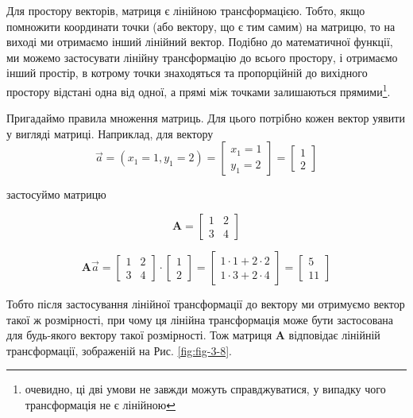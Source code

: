 \documentclass[
  11pt,
]{book}
\begin{document}
Для простору векторів, матриця є лінійною трансформацією. Тобто, якщо помножити координати точки (або вектору, що є тим самим) на матрицю, то на виході ми отримаємо інший лінійний вектор. Подібно до математичної функції, ми можемо застосувати лінійну трансформацію до всього простору, і отримаємо інший простір, в котрому точки знаходяться та пропорційній до вихідного простору відстані одна від одної, а прямі між точками залишаються прямими\footnote{очевидно, ці дві умови не завжди можуть справджуватися, у випадку чого трансформація не є лінійною}.

Пригадаймо правила множення матриць. Для цього потрібно кожен вектор уявити у вигляді матриці. Наприклад, для вектору \[\vec{a} = (x_1 = 1, y_1 = 2) = \begin{bmatrix} 
x_1 = 1 \\ 
y_1 = 2 \end{bmatrix} = \begin{bmatrix}
1 \\
2 \end{bmatrix}\]

застосуймо матрицю

\[\mathbf{A} = \begin{bmatrix}
1 & 2 \\
3 & 4
\end{bmatrix}\]

\[
\mathbf{A} \vec{a} = \begin{bmatrix}
1 & 2 \\
3 & 4
\end{bmatrix} \cdot \begin{bmatrix}
1 \\ 2 
\end{bmatrix}= \begin{bmatrix}
1 \cdot 1 + 2 \cdot 2 \\
1 \cdot 3 + 2 \cdot 4
\end{bmatrix} = \begin{bmatrix}
5 \\ 11
\end{bmatrix}
\]

Тобто після застосування лінійної трансформації до вектору ми отримуємо вектор такої ж розмірності, при чому ця лінійна трансформація може бути застосована для будь-якого вектору такої розмірності. Тож матриця \(\mathbf{A}\) відповідає лінійній трансформації, зображеній на Рис. \ref{fig:fig-3-8}.
\end{document}
